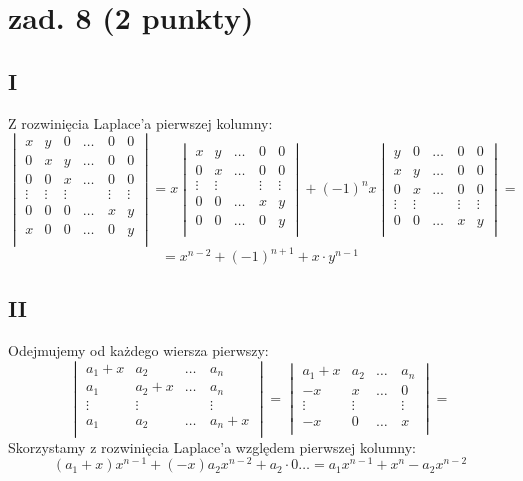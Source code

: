 \documentclass{article}
\begin{document}
\section{zad. 8 (2 punkty)}
\subsection*{I}
Z rozwinięcia Laplace'a pierwszej kolumny:
$$
\begin{vmatrix}
x & y & 0 & \dots & 0 & 0 \\
0 & x & y & \dots & 0 & 0 \\
0 & 0 & x & \dots & 0 & 0 \\
\vdots & \vdots & \vdots & \quad &\vdots &\vdots \\
0 & 0 & 0 & \dots & x & y \\
x & 0 & 0 & \dots & 0 & y \\
\end{vmatrix}
=x
\begin{vmatrix}
 x & y & \dots & 0 & 0 \\
 0 & x & \dots & 0 & 0 \\
 \vdots & \vdots & \quad &\vdots &\vdots \\
 0 & 0 & \dots & x & y \\
 0 & 0 & \dots & 0 & y \\
\end{vmatrix}
+ {(-1)}^n x
\begin{vmatrix}
 y & 0 & \dots & 0 & 0 \\
 x & y & \dots & 0 & 0 \\
 0 & x & \dots & 0 & 0 \\
 \vdots & \vdots & \quad &\vdots &\vdots \\
0 & 0 & \dots & x & y \\
\end{vmatrix}=
$$
$$
= x^{n-2} + {(-1)}^{n+1}+ x\cdot y^{n-1}
$$

\subsection*{II}
Odejmujemy od każdego wiersza pierwszy:
$$
\begin{vmatrix}
a_1 + x & a_2 & \dots & a_n \\
a_1  & a_2 +x & \dots & a_n \\
\vdots  & \vdots & \quad & \vdots \\
a_1  & a_2  & \dots & a_n + x \\
\end{vmatrix}=
\begin{vmatrix}
a_1 + x & a_2 & \dots & a_n \\
-x & x & \dots & 0 \\
\vdots  & \vdots & \quad & \vdots \\
-x & 0  & \dots &  x \\
\end{vmatrix}=
$$
Skorzystamy z rozwinięcia Laplace'a względem pierwszej kolumny:
$$
(a_1 + x)x^{n-1} + (-x)a_2x^{n-2} + a_2\cdot 0 \dots = a_1x^{n-1} + x^n - a_2x^{n-2}
$$
\end{document}
